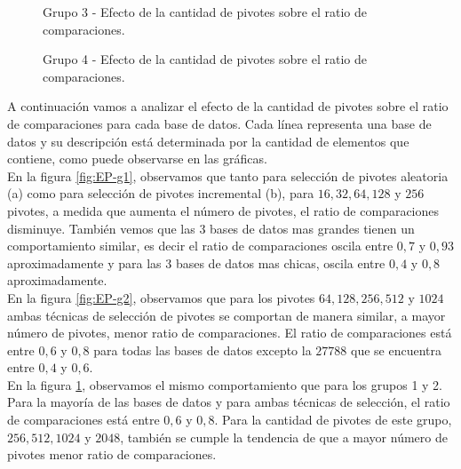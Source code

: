 \begin{figure}[tb]
\centering
{}
		\caption{\small Grupo 3 - Efecto de la cantidad de pivotes sobre el ratio de comparaciones.}
		\label{fig:EP-g3}
\end{figure}

\begin{figure}[tb]
\centering	
{}
		\caption{\small Grupo 4 - Efecto de la cantidad de pivotes sobre el ratio de comparaciones.}
		\label{fig:EP-g4}
\end{figure}

A continuaci\'on vamos a analizar el efecto de la cantidad de pivotes sobre el ratio de comparaciones para cada base de datos. Cada l\'inea representa una base de datos y su descripci\'on est\'a determinada por la cantidad de elementos que contiene, como puede observarse en las gr\'aficas.\\

En la figura \ref{fig:EP-g1}, observamos que tanto para selecci\'on de pivotes aleatoria (a) como para selecci\'on de pivotes incremental (b), para $16, 32, 64, 128$ y $256$ pivotes, a medida que aumenta el n\'umero de pivotes, el ratio de comparaciones disminuye. Tambi\'en vemos que las 3 bases de datos mas grandes tienen un comportamiento similar, es decir el ratio de comparaciones oscila entre $0,7$ y $0,93$ aproximadamente y para las 3 bases de datos mas chicas, oscila entre $0,4$ y $0,8$ aproximadamente.\\

En la figura \ref{fig:EP-g2}, observamos que para los pivotes $64, 128, 256, 512$ y $1024$ ambas t\'ecnicas de selecci\'on de pivotes se comportan de manera similar, a mayor n\'umero de pivotes, menor ratio de comparaciones. El ratio de comparaciones est\'a entre $0,6$ y $0,8$ para todas las bases de datos excepto la $27788$ que se encuentra entre $0,4$ y $0,6$.\\

En la figura \ref{fig:EP-g3}, observamos el mismo comportamiento que para los grupos 1 y 2. Para la mayor\'ia de las bases de datos y para ambas t\'ecnicas de selecci\'on, el ratio de comparaciones est\'a entre $0,6$ y $0,8$. Para la cantidad de pivotes de este grupo, $256, 512, 1024$ y $2048$, tambi\'en se cumple la tendencia de que a mayor n\'umero de pivotes menor ratio de comparaciones.\\

